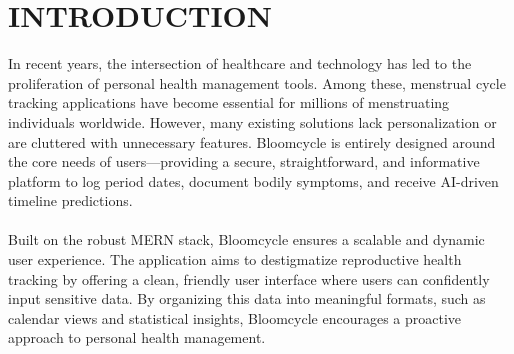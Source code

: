 \chapter{INTRODUCTION}

In recent years, the intersection of healthcare and technology has led to the proliferation of personal health management tools. Among these, menstrual cycle tracking applications have become essential for millions of menstruating individuals worldwide. However, many existing solutions lack personalization or are cluttered with unnecessary features. Bloomcycle is entirely designed around the core needs of users—providing a secure, straightforward, and informative platform to log period dates, document bodily symptoms, and receive AI-driven timeline predictions.
\\\\
Built on the robust MERN stack, Bloomcycle ensures a scalable and dynamic user experience. The application aims to destigmatize reproductive health tracking by offering a clean, friendly user interface where users can confidently input sensitive data. By organizing this data into meaningful formats, such as calendar views and statistical insights, Bloomcycle encourages a proactive approach to personal health management.
